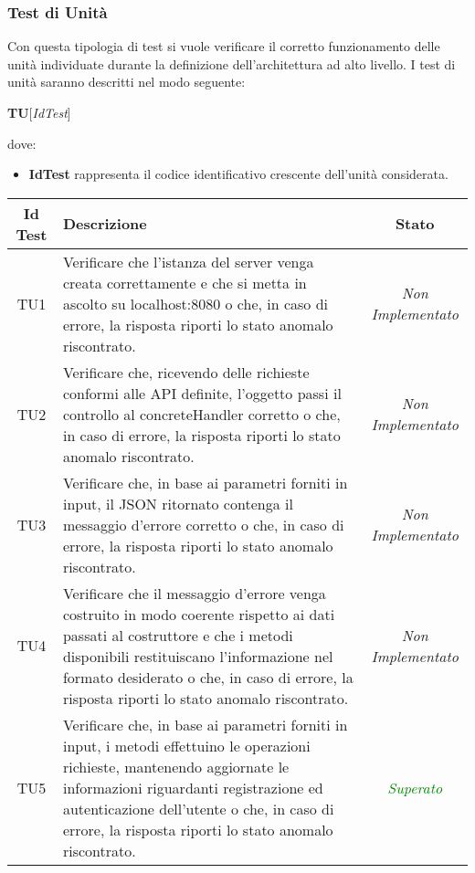 \subsubsection{Test di Unità}
Con questa tipologia di test si vuole verificare il corretto funzionamento delle unità individuate durante la definizione dell'architettura ad alto livello.
I test di unità saranno descritti nel modo seguente:
\begin{center}
\textbf{TU}[\textit{IdTest}]
\end{center}
dove:
\begin{itemize}
\item \textbf{IdTest} rappresenta il codice identificativo crescente dell'unità considerata.
\end{itemize}

\normalsize
\begin{longtable}{|c|>{}m{10cm}|c|}
\hline 
\textbf{Id Test} & \textbf{Descrizione} & \textbf{Stato}\\
\hline
\endhead
\hypertarget{TU1}{TU1} & Verificare che l’istanza del server venga creata correttamente e che si metta in ascolto su localhost:8080 o che, in caso di errore, la risposta riporti lo stato anomalo riscontrato. & \textit{Non Implementato}\\ \hline
\hypertarget{TU2}{TU2} & Verificare che, ricevendo delle richieste conformi alle API definite, l’oggetto passi il controllo al
concreteHandler corretto o che, in caso di errore, la risposta riporti lo stato anomalo riscontrato. & \textit{Non Implementato}\\ \hline
\hypertarget{TU3}{TU3} & Verificare che, in base ai parametri forniti in input, il
JSON ritornato contenga il messaggio d’errore corretto o che, in caso di errore, la risposta riporti lo
stato anomalo riscontrato. & \textit{Non Implementato}\\ \hline
\hypertarget{TU4}{TU4} & Verificare che il messaggio d’errore venga costruito
in modo coerente rispetto ai dati passati al costruttore
e che i metodi disponibili restituiscano l’informazione nel formato desiderato o che, in caso di errore, la
risposta riporti lo stato anomalo riscontrato. & \textit{Non Implementato}\\ \hline
\hypertarget{TU5}{TU5} & Verificare che, in base ai parametri forniti in input, i
metodi effettuino le operazioni richieste, mantenendo
aggiornate le informazioni riguardanti registrazione
ed autenticazione dell’utente o che, in caso di errore,
la risposta riporti lo stato anomalo riscontrato. & \textcolor{Green}{\textit{Superato}}\\ \hline

\end{longtable}
